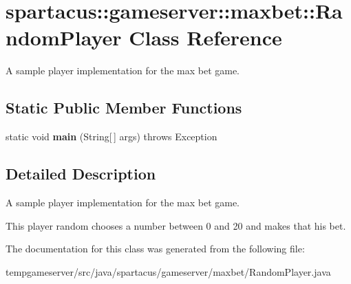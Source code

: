 \hypertarget{classspartacus_1_1gameserver_1_1maxbet_1_1RandomPlayer}{
\section{\-s\-p\-a\-r\-t\-a\-c\-u\-s\-:\-:\-g\-a\-m\-e\-s\-e\-r\-v\-e\-r\-:\-:\-m\-a\-x\-b\-e\-t\-:\-:\-R\-a\-n\-d\-o\-m\-P\-l\-a\-y\-e\-r \-C\-l\-a\-s\-s \-R\-e\-f\-e\-r\-e\-n\-c\-e}
\label{classspartacus_1_1gameserver_1_1maxbet_1_1RandomPlayer}
}


A sample player implementation for the max bet game.  


\subsection*{Static Public Member Functions}
\begin{DoxyCompactItemize}
\item 
\hypertarget{classspartacus_1_1gameserver_1_1maxbet_1_1RandomPlayer_ad37d1be20500a4f1a302c2f4374192d0}{
\-s\-t\-a\-t\-i\-c \-v\-o\-i\-d {\bfseries \-m\-a\-i\-n} \-(\-S\-t\-r\-i\-n\-g\mbox{[}$\,$\mbox{]} \-a\-r\-g\-s\-)  \-t\-h\-r\-o\-ws \-E\-x\-c\-e\-p\-t\-i\-on }
\label{classspartacus_1_1gameserver_1_1maxbet_1_1RandomPlayer_ad37d1be20500a4f1a302c2f4374192d0}

\end{DoxyCompactItemize}


\subsection{Detailed Description}
A sample player implementation for the max bet game. 

This player random chooses a number between 0 and 20 and makes that his bet. 

The documentation for this class was generated from the following file:\begin{DoxyCompactItemize}
\item 
\-t\-e\-m\-p\-g\-a\-m\-e\-s\-e\-r\-v\-e\-r\-/\-s\-r\-c\-/\-j\-a\-v\-a\-/\-s\-p\-a\-r\-t\-a\-c\-u\-s\-/\-g\-a\-m\-e\-s\-e\-r\-v\-e\-r\-/\-m\-a\-x\-b\-e\-t\-/\-R\-a\-n\-d\-o\-m\-P\-l\-a\-y\-e\-r\-.\-j\-a\-v\-a\end{DoxyCompactItemize}
